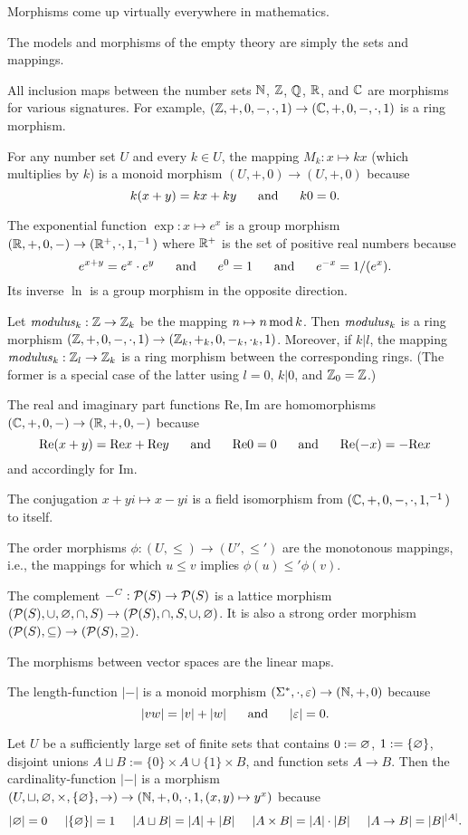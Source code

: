 \begin{example}[Morphisms]
Morphisms come up virtually everywhere in mathematics.
\begin{compactitem}
\item The models and morphisms of the empty theory are simply the sets and mappings.
\item All inclusion maps between the number sets $\mathbb{N}$, $\mathbb{Z}$, $\mathbb{Q}$, $\mathbb{R}$, and $\mathbb{C}$ are morphisms for various signatures.
For example, $(\mathbb{Z},+,0,-,\cdot,1)\to(\mathbb{C},+,0,-,\cdot,1)$ is a ring morphism.
\item For any number set $U$ and every $k\in U$, the mapping $M_k:x\mapsto kx$ (which multiplies by $k$) is a monoid morphism $(U,+,0)\to(U,+,0)$ because
\[k(x+y)=kx+ky\hspace*{.5cm}\;\mathrm{and}\;\hspace*{.5cm} k0=0.\]
\item The exponential function $\exp:x\mapsto e^x$ is a group morphism $(\mathbb{R},+,0,-)\to(\mathbb{R}^+,\cdot,1,^{-1})$ where $\mathbb{R}^+$ is the set of positive real numbers because
\[e^{x+y}=e^x\cdot e^y\hspace*{.5cm}\;\mathrm{and}\;\hspace*{.5cm} e^0=1\hspace*{.5cm}\;\mathrm{and}\;\hspace*{.5cm} e^{-x}=1/(e^x).\]
Its inverse $\ln$ is a group morphism in the opposite direction.
\item Let $\mathit{modulus}_k:\mathbb{Z}\to\mathbb{Z}_k$ be the mapping $n\mapsto n\mathop{\mathrm{mod}} k$.
Then $\mathit{modulus}_k$ is a ring morphism $(\mathbb{Z},+,0,-,\cdot,1)\to(\mathbb{Z}_k,+_k,0,-_k,\cdot_k,1)$.
Moreover, if $k|l$, the mapping $\mathit{modulus}_k:\mathbb{Z}_l\to\mathbb{Z}_k$ is a ring morphism between the corresponding rings.
(The former is a special case of the latter using $l=0$, $k|0$, and $\mathbb{Z}_0=\mathbb{Z}$.)
\item The real and imaginary part functions $\mathrm{Re,Im}$ are homomorphisms $(\mathbb{C},+,0,-)\to(\mathbb{R},+,0,-)$ because
\[\mathrm{Re}(x+y)=\mathrm{Re}x+\mathrm{Re}y\hspace*{.5cm}\;\mathrm{and}\;\hspace*{.5cm} \mathrm{Re}0=0\hspace*{.5cm}\;\mathrm{and}\;\hspace*{.5cm}\mathrm{Re}(-x)=-\mathrm{Re}x\]
and accordingly for $\mathrm{Im}$.
\item The conjugation $x+yi\mapsto x-yi$ is a field isomorphism from $(\mathbb{C},+,0,-,\cdot,1,^{-1})$ to itself.
\item The order morphisms $\phi:(U,\leq)\to(U',\leq')$ are the monotonous mappings, i.e., the mappings for which $u\leq v$ implies $\phi(u)\leq'\phi(v)$.
\item The complement $-^C:\mathcal{P}(S)\to\mathcal{P}(S)$ is a lattice morphism $(\mathcal{P}(S),\cup,\varnothing,\cap,S)\to(\mathcal{P}(S),\cap,S,\cup,\varnothing)$.
It is also a strong order morphism $(\mathcal{P}(S),\subseteq)\to(\mathcal{P}(S),\supseteq)$.
\item The morphisms between vector spaces are the linear maps.
\item The length-function $|-|$ is a monoid morphism $(\Sigma^*,\cdot,\varepsilon)\to(\mathbb{N},+,0)$ because
\[|vw|=|v|+|w|\hspace*{.5cm}\;\mathrm{and}\;\hspace*{.5cm} |\varepsilon|=0.\]
\item Let $U$ be a sufficiently large set of finite sets that contains $0:=\varnothing$, $1:=\{\varnothing\}$, disjoint unions $A\sqcup B:=\{0\}\times A\cup \{1\}\times B$, and function sets $A\to B$.
Then the cardinality-function $|-|$ is a morphism $(U,\sqcup,\varnothing,\times,\{\varnothing\},\to)\to(\mathbb{N},+,0,\cdot,1,(x,y)\mapsto y^x)$ because
\[|\varnothing|=0 \hspace*{.5cm} |\{\varnothing\}|=1 \hspace*{.5cm} |A\sqcup B|=|A|+|B| \hspace*{.5cm} |A\times B|=|A|\cdot |B| \hspace*{.5cm} |A\to B|=|B|^{|A|}.\]
\end{compactitem}
\end{example}

